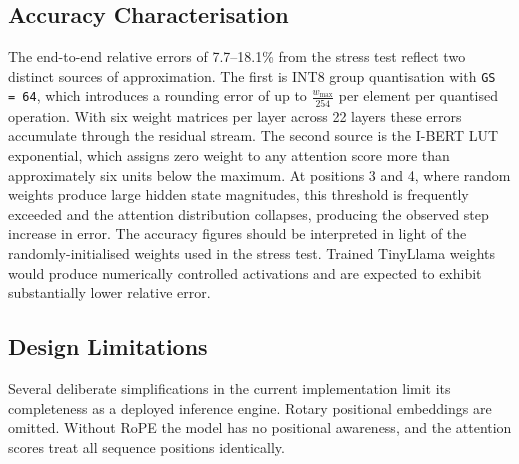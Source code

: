 \subsection{Accuracy Characterisation}
\label{subsec:accuracy}

The end-to-end relative errors of 7.7--18.1\% from the stress test reflect
two distinct sources of approximation. The first is INT8 group quantisation
with \texttt{GS\,=\,64}, which introduces a rounding error of up to
$\frac{w_{\max}}{254}$ per element per quantised operation. With six weight
matrices per layer across 22 layers these errors accumulate through the
residual stream. The second source is the I-BERT LUT exponential, which
assigns zero weight to any attention score more than approximately six units
below the maximum. At positions 3 and 4, where random weights produce large
hidden state magnitudes, this threshold is frequently exceeded and the
attention distribution collapses, producing the observed step increase in
error. The accuracy figures should be interpreted in light of the
randomly-initialised weights used in the stress test. Trained TinyLlama
weights would produce numerically controlled activations and are expected to
exhibit substantially lower relative error.

\subsection{Design Limitations}
\label{subsec:limitations}

Several deliberate simplifications in the current implementation limit its
completeness as a deployed inference engine. Rotary positional embeddings are omitted. Without RoPE
the model has no positional awareness, and the attention scores treat all
sequence positions identically.



